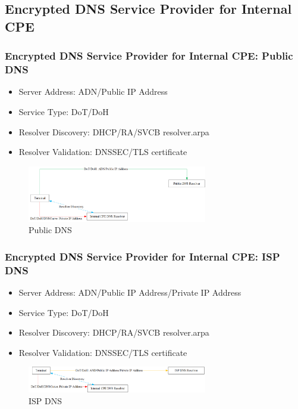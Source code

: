 \documentclass{ctexbeamer}
\begin{document}
\subsection{Encrypted DNS Service Provider for Internal CPE}
\begin{frame}
    \frametitle{Encrypted DNS Service Provider for Internal CPE: Public DNS}
           \begin{itemize}
               \item Server Address: ADN/Public IP Address
               \item Service Type: DoT/DoH
               \item Resolver Discovery: DHCP/RA/SVCB resolver.arpa
               \item Resolver Validation: DNSSEC/TLS certificate
           \end{itemize}

    \begin{figure}[H]
        \centering 
        \includegraphics[width=0.7\textwidth]{pic/public_dns.png} 
        \caption{Public DNS} 
        \label{fig.public_dns}
    \end{figure}

\end{frame}

\begin{frame}
    \frametitle{Encrypted DNS Service Provider for Internal CPE: ISP DNS}
           \begin{itemize}
               \item Server Address: ADN/Public IP Address/Private IP Address
               \item Service Type: DoT/DoH
               \item Resolver Discovery: DHCP/RA/SVCB resolver.arpa
               \item Resolver Validation: DNSSEC/TLS certificate
           \end{itemize}

    \begin{figure}[H]
        \centering 
        \includegraphics[width=0.7\textwidth]{pic/isp_dns.png} 
        \caption{ISP DNS} 
        \label{fig.isp_dns}
    \end{figure}

\end{frame}
\end{document}
